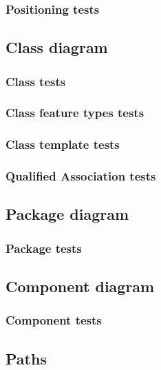   \subsubsection{Positioning tests}

\subsection{Class diagram}
  \subsubsection{Class tests}
  \subsubsection{Class feature types tests}
  \subsubsection{Class template tests}

  \subsubsection{Qualified Association tests}
    
\subsection{Package diagram}
\subsubsection{Package tests}

\subsection{Component diagram}
\subsubsection{Component tests}

\subsection{Paths}

